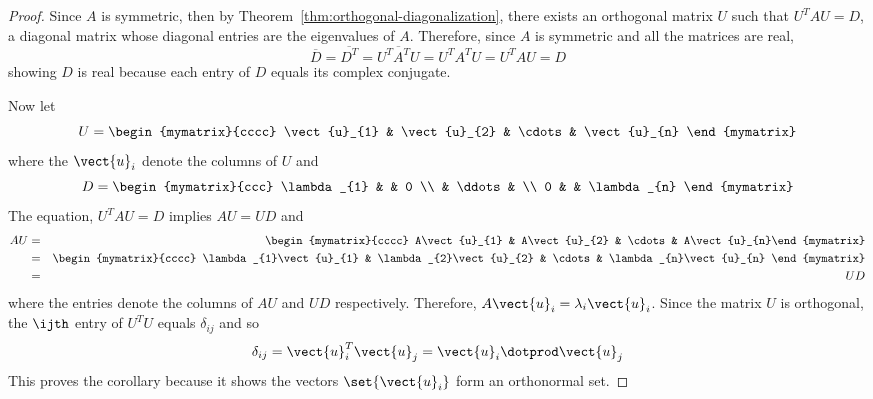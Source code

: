 \begin{proof}
Since $A$ is symmetric, then by Theorem~\ref{thm:orthogonal-diagonalization},
there exists an orthogonal matrix $U$ such that $U^{T}AU=D$, a diagonal
matrix whose diagonal entries are the eigenvalues of $A$. Therefore, since $
A $ is symmetric and all the matrices are real,
\begin{equation*}
\overline{D}=\overline{D^{T}}=\overline{U^{T}A^{T}U}=U^{T}A^{T}U=U^{T}AU=D
\end{equation*}
showing $D$ is real because each entry of $D$ equals its complex conjugate.

Now let
\begin{equation*}
U=\begin{mymatrix}{cccc}
\vect{u}_{1} & \vect{u}_{2} & \cdots & \vect{u}_{n}
\end{mymatrix}
\end{equation*}
where the $\vect{u}_{i}$ denote the columns of $U$ and
\begin{equation*}
D=\begin{mymatrix}{ccc}
\lambda _{1} &  & 0 \\
& \ddots &  \\
0 &  & \lambda _{n}
\end{mymatrix}
\end{equation*}
The equation, $U^{T}AU=D$ implies $AU = UD$ and
\begin{eqnarray*}
AU &=&\begin{mymatrix}{cccc}
A\vect{u}_{1} & A\vect{u}_{2} & \cdots & A\vect{u}_{n}%
\end{mymatrix} \\
&=&\begin{mymatrix}{cccc}
\lambda _{1}\vect{u}_{1} & \lambda _{2}\vect{u}_{2} & \cdots & \lambda
_{n}\vect{u}_{n}
\end{mymatrix} \\
&=& UD
\end{eqnarray*}
where the entries denote the columns of $AU$ and $UD$ respectively.
Therefore, $A\vect{u}_{i}=\lambda _{i}\vect{u}_{i}$.  Since the matrix $U$
is orthogonal, the $\ijth$ entry of $U^{T}U$ equals $\delta _{ij}$ and so
\begin{equation*}
\delta _{ij}=\vect{u}_{i}^{T}\vect{u}_{j}=\vect{u}_{i}\dotprod \vect{u}
_{j}
\end{equation*}
This proves the corollary because it shows the vectors $\set{\vect{u}
_{i}} $ form an orthonormal set.
\end{proof}

